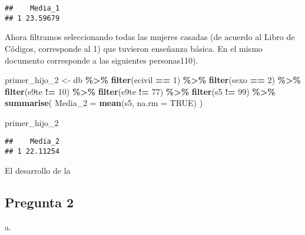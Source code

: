 \documentclass[
]{article}
\newenvironment{Shaded}{\begin{snugshade}}{\end{snugshade}}
\newcommand{\AttributeTok}[1]{\textcolor[rgb]{0.13,0.29,0.53}{#1}}
\newcommand{\ConstantTok}[1]{\textcolor[rgb]{0.56,0.35,0.01}{#1}}
\newcommand{\DecValTok}[1]{\textcolor[rgb]{0.00,0.00,0.81}{#1}}
\newcommand{\FunctionTok}[1]{\textcolor[rgb]{0.13,0.29,0.53}{\textbf{#1}}}
\newcommand{\NormalTok}[1]{#1}
\newcommand{\OtherTok}[1]{\textcolor[rgb]{0.56,0.35,0.01}{#1}}
\newcommand{\SpecialCharTok}[1]{\textcolor[rgb]{0.81,0.36,0.00}{\textbf{#1}}}
\begin{document}
\begin{verbatim}
##    Media_1
## 1 23.59679
\end{verbatim}

Ahora filtramos seleccionando todas las mujeres casadas (de acuerdo al
Libro de Códigos, corresponde al 1) que tuvieron enseñanza básica. En el
mismo documento corresponde a las siguientes personas110).

\begin{Shaded}
\begin{Highlighting}[]
\NormalTok{primer\_hijo\_2 }\OtherTok{\textless{}{-}}\NormalTok{ db }\SpecialCharTok{\%\textgreater{}\%} \FunctionTok{filter}\NormalTok{(ecivil }\SpecialCharTok{==} \DecValTok{1}\NormalTok{) }\SpecialCharTok{\%\textgreater{}\%}
  \FunctionTok{filter}\NormalTok{(sexo }\SpecialCharTok{==} \DecValTok{2}\NormalTok{) }\SpecialCharTok{\%\textgreater{}\%}
  \FunctionTok{filter}\NormalTok{(e9te }\SpecialCharTok{!=} \DecValTok{10}\NormalTok{) }\SpecialCharTok{\%\textgreater{}\%}
  \FunctionTok{filter}\NormalTok{(e9te }\SpecialCharTok{!=} \DecValTok{77}\NormalTok{) }\SpecialCharTok{\%\textgreater{}\%}
  \FunctionTok{filter}\NormalTok{(s5 }\SpecialCharTok{!=} \DecValTok{99}\NormalTok{) }\SpecialCharTok{\%\textgreater{}\%}
  \FunctionTok{summarise}\NormalTok{(}
    \AttributeTok{Media\_2 =} \FunctionTok{mean}\NormalTok{(s5, }\AttributeTok{na.rm =} \ConstantTok{TRUE}\NormalTok{)}
\NormalTok{  )}

\NormalTok{primer\_hijo\_2}
\end{Highlighting}
\end{Shaded}

\begin{verbatim}
##    Media_2
## 1 22.11254
\end{verbatim}

El desarrollo de la

\hypertarget{pregunta-2}{%
\subsection{Pregunta 2}\label{pregunta-2}}

a.
\end{document}
